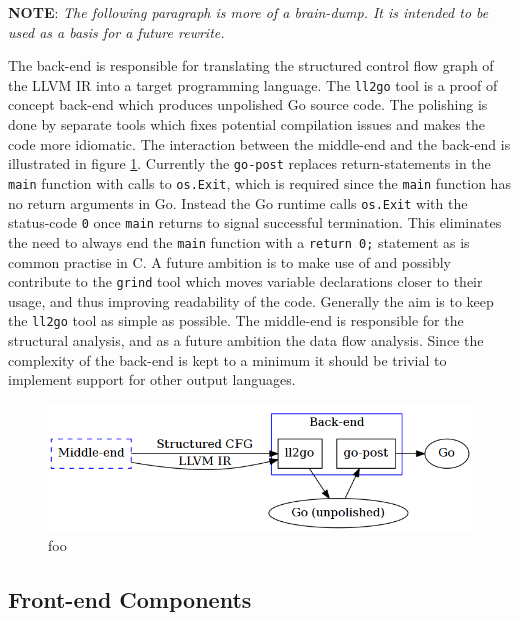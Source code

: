 \textbf{NOTE}: \textit{The following paragraph is more of a brain-dump. It is intended to be used as a basis for a future rewrite.}

The back-end is responsible for translating the structured control flow graph of the LLVM IR into a target programming language. The \texttt{ll2go} tool is a proof of concept back-end which produces unpolished Go source code. The polishing is done by separate tools which fixes potential compilation issues and makes the code more idiomatic. The interaction between the middle-end and the back-end is illustrated in figure \ref{fig:back-end}. Currently the \texttt{go-post} replaces return-statements in the \texttt{main} function with calls to \texttt{os.Exit}, which is required since the \texttt{main} function has no return arguments in Go. Instead the Go runtime calls \texttt{os.Exit} with the status-code \texttt{0} once \texttt{main} returns to signal successful termination. This eliminates the need to always end the \texttt{main} function with a \texttt{return 0;} statement as is common practise in C. A future ambition is to make use of and possibly contribute to the \texttt{grind} tool which moves variable declarations closer to their usage, and thus improving readability of the code. Generally the aim is to keep the \texttt{ll2go} tool as simple as possible. The middle-end is responsible for the structural analysis, and as a future ambition the data flow analysis. Since the complexity of the back-end is kept to a minimum it should be trivial to implement support for other output languages.

\begin{figure}[htbp]
	\begin{center}
		\includegraphics[width=\textwidth]{inc/back-end.png}
		\caption{foo}
		\label{fig:back-end}
	\end{center}
\end{figure}


\subsection{Front-end Components}

